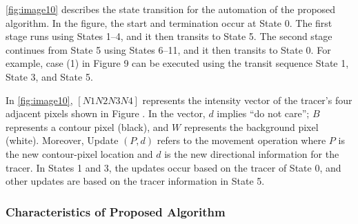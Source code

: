 \ref{fig:image10} describes the state transition for the automation of the proposed algorithm. In the figure, the start and termination occur at State 0. The first stage runs using States 1–4, and it then transits to State 5. The second stage continues from State 5 using States 6–11, and it then transits to State 0. For example, case (1) in Figure 9 can be executed using the transit sequence State 1, State 3, and State 5. 


In \ref{fig:image10}, $[N1 N2 N3 N4]$ represents the intensity vector of the tracer’s four adjacent pixels shown in Figure . In the vector, $d$ implies ``do not care''; $B$ represents a contour pixel (black), and $W$ represents the background pixel (white). Moreover, Update $(P,d)$ refers to the movement operation where $P$ is the new contour-pixel location and $d$ is the new directional information for the tracer. In States 1 and 3, the updates occur based on the tracer of State 0, and other updates are based on the tracer information in State 5.

\subsubsection{Characteristics of Proposed Algorithm}



